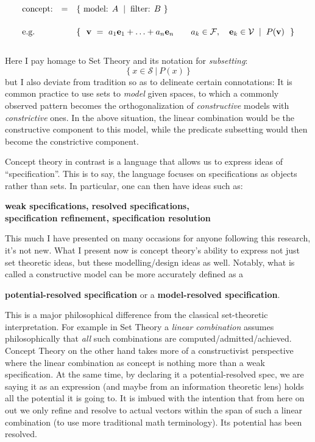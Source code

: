 \documentclass[twoside]{article}
\newcommand{\strong}[1]{{\bfseries #1}}
\newcommand{\bv}[1][v]{\ensuremath{\mathbf #1}}
\newcommand{\tab}[1][1.125cm]{\hspace{#1}}
\begin{document}
\newpage


\ \\
$$ \begin{array}{lcllll}
\mbox{concept:} 	& = & \{\ \mbox{model: } A\tab[0.2cm] |\tab[0.2cm] \mbox{filter: } B\ \}		\\[1.5em]
\mbox{e.g.}		&   & \{\ \ \bv\ =\ a_1\bv[e]_1+\ldots+a_n\bv[e]_n \qquad a_k\in\mathcal{F},\quad
				\bv[e]_k\in\mathcal{V} \tab[0.2cm] |\tab[0.2cm] P(\bv)\ \ \}
\end{array} $$
\ \\

Here I pay homage to Set Theory and its notation for \emph{subsetting}:
$$ \{\ x\in\mathcal{S}\ |\ P(x)\ \} $$
but I also deviate from tradition so as to delineate certain connotations: It is common practice to use sets to
\emph{model} given spaces, to which a commonly observed pattern becomes the orthogonalization of \emph{constructive}
models with \emph{constrictive} ones. In the above situation, the linear combination would be the constructive component
to this model, while the predicate subsetting would then become the constrictive component.

Concept theory in contrast is a language that allows us to express ideas of ``specification''. This is to say, the language
focuses on specifications as objects rather than sets. In particular, one can then have ideas such as:
\begin{center}
\strong{weak specifications,\tab[1em] resolved specifications,\\specification refinement,\tab[1em] specification resolution}
\end{center}
This much I have presented on many occasions for anyone following this research, it's not new. What I present now is concept
theory's ability to express not just set theoretic ideas, but these modelling/design ideas as well. Notably, what is called
a constructive model can be more accurately defined as a
\begin{center}
\strong{potential-resolved specification}\tab[1em] or a\tab[1em] \strong{model-resolved specification}.
\end{center}

This is a major philosophical difference from the classical set-theoretic interpretation. For example in Set Theory
a \emph{linear combination} assumes philosophically that \emph{all} such combinations are computed/admitted/achieved.
Concept Theory on the other hand takes more of a constructivist perspective where the linear combination as concept
is nothing more than a weak specification. At the same time, by declaring it a potential-resolved spec, we are saying
it as an expression (and maybe from an information theoretic lens) holds all the potential it is going to. It is imbued
with the intention that from here on out we only refine and resolve to actual vectors within the span of such a linear
combination (to use more traditional math terminology). Its potential has been resolved.
\end{document}
